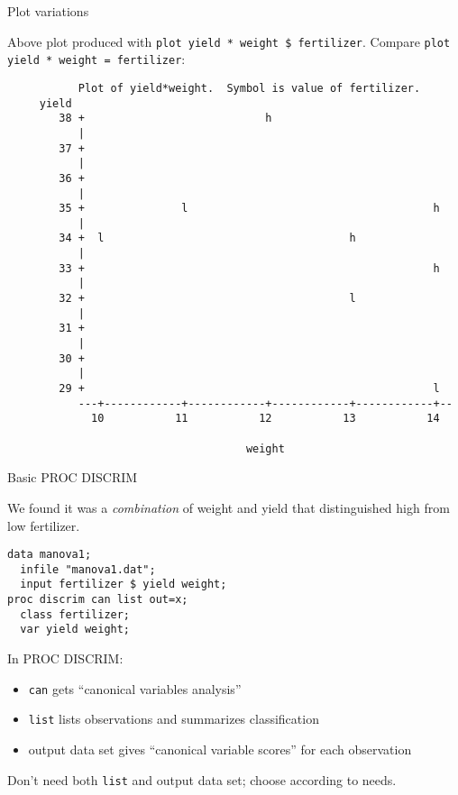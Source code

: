 \documentclass[pdf]{prosper}
\begin{document}
\begin{slide}{Plot variations}

Above plot produced with \verb=plot yield * weight $ fertilizer=. Compare \verb-plot yield * weight = fertilizer-:

{\tiny
\begin{verbatim}
           Plot of yield*weight.  Symbol is value of fertilizer.
     yield
        38 +                            h
           |
        37 +
           |
        36 +
           |
        35 +               l                                      h
           |
        34 +  l                                      h
           |
        33 +                                                      h
           |
        32 +                                         l
           |
        31 +
           |
        30 +
           |
        29 +                                                      l
           ---+------------+------------+------------+------------+--
             10           11           12           13           14

                                     weight

\end{verbatim}
}
  
\end{slide}


\begin{slide}{Basic PROC DISCRIM}
  
We found it was a {\em combination} of weight and yield that distinguished high from low fertilizer.

\begin{verbatim}
data manova1;
  infile "manova1.dat";
  input fertilizer $ yield weight;
proc discrim can list out=x;
  class fertilizer;
  var yield weight;

\end{verbatim}

In PROC DISCRIM:

\begin{itemize}
\item \verb-can- gets ``canonical variables analysis''
\item \verb-list- lists observations and summarizes classification
\item output data set gives ``canonical variable scores'' for each observation
\end{itemize}
Don't need both \verb-list- and output data set; choose according to needs.

\end{slide}
\end{document}
